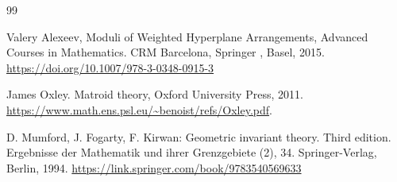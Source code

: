\documentclass[12pt, reqno]{amsart}
\theoremstyle{definition}
\theoremstyle{remark}
\numberwithin{equation}{section}
\begin{document}
\begin{thebibliography}{99}









  Valery Alexeev, Moduli of Weighted Hyperplane Arrangements, Advanced Courses in Mathematics. CRM Barcelona, Springer
, Basel, 2015.
\url{https://doi.org/10.1007/978-3-0348-0915-3}






 James Oxley. Matroid theory, Oxford
University Press, 2011.
\url{https://www.math.ens.psl.eu/~benoist/refs/Oxley.pdf}.



 D. Mumford, J. Fogarty, F. Kirwan: Geometric invariant theory. Third edition. Ergebnisse
der Mathematik und ihrer Grenzgebiete (2), 34. Springer-Verlag, Berlin, 1994.
\url{https://link.springer.com/book/9783540569633}




 
 
 






\end{thebibliography}
\end{document}
